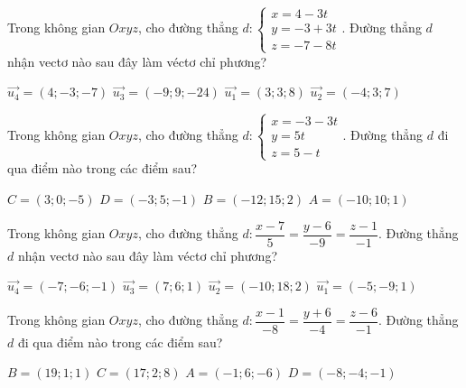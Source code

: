 \documentclass[12pt,a4paper]{article}
\begin{document}
\begin{ex}
 Trong không gian ${Oxyz}$, cho đường thẳng ${d}:\left\{ \begin{array}{l}x = 4-3t\\ y = -3+3t\\z = -7-8t\end{array} \right.$. Đường thẳng ${d}$ nhận vectơ nào sau đây làm véctơ chỉ phương?
 
\choice
{ $\overrightarrow{u_4}=(4;-3;-7)$ }
   { \True $\overrightarrow{u_3}=(-9;9;-24)$ }
     { $\overrightarrow{u_1}=(3;3;8)$ }
    { $\overrightarrow{u_2}=(-4;3;7)$ }
\end{ex}

\begin{ex}
 Trong không gian ${Oxyz}$, cho đường thẳng ${d}:\left\{ \begin{array}{l}x = -3-3t\\ y = 5t\\z = 5-t\end{array} \right.$. Đường thẳng ${d}$ đi qua điểm nào trong các điểm sau?
 
\choice
{ $C=(3;0;-5)$ }
   { $D=(-3;5;-1)$ }
     { \True $B=(-12;15;2)$ }
    { $A=(-10;10;1)$ }
\end{ex}

\begin{ex}
 Trong không gian ${Oxyz}$, cho đường thẳng ${d}:\dfrac{x - 7}{5}=\dfrac{y - 6}{-9}=\dfrac{z - 1}{-1}$. Đường thẳng ${d}$ nhận vectơ nào sau đây làm véctơ chỉ phương?
 
\choice
{ $\overrightarrow{u_4}=(-7;-6;-1)$ }
   { $\overrightarrow{u_3}=(7;6;1)$ }
     { \True $\overrightarrow{u_2}=(-10;18;2)$ }
    { $\overrightarrow{u_1}=(-5;-9;1)$ }
\end{ex}

\begin{ex}
 Trong không gian ${Oxyz}$, cho đường thẳng ${d}:\dfrac{x - 1}{-8}=\dfrac{y + 6}{-4}=\dfrac{z - 6}{-1}$. Đường thẳng ${d}$ đi qua điểm nào trong các điểm sau?
 
\choice
{ $B=(19;1;1)$ }
   { \True $C=(17;2;8)$ }
     { $A=(-1;6;-6)$ }
    { $D=(-8;-4;-1)$ }
\end{ex}
\end{document}
